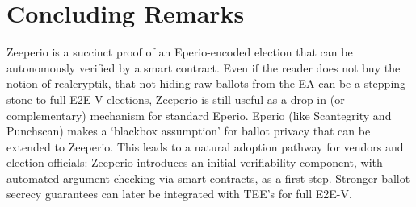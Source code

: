 


\section{Concluding Remarks}

Zeeperio is a succinct proof of an Eperio-encoded election that can be autonomously verified by a smart contract. Even if the reader does not buy the notion of realcryptik, that not hiding raw ballots from the EA can be a stepping stone to full E2E-V elections, Zeeperio is still useful as a drop-in (or complementary) mechanism for standard Eperio. Eperio (like Scantegrity and Punchscan) makes a `blackbox assumption' for ballot privacy that can be extended to Zeeperio. This leads to a natural adoption pathway for vendors and election officials: Zeeperio introduces an initial verifiability component, with automated argument checking via smart contracts, as a first step. Stronger ballot secrecy guarantees can later be integrated with TEE's for full E2E-V.








